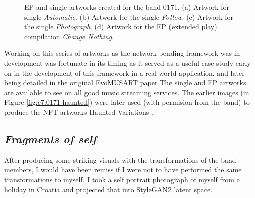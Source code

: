 \begin{figure}[!htbp]
    \caption[0171 EP artworks]{EP and single artworks created for the band 0171. (a) Artwork for single \textit{Automatic}. (b) Artwork for the single \textit{Follow}. (c) Artwork for the single \textit{Photograph}. (d) Artwork for the EP (extended play) compilation \textit{Change Nothing}.}
    \label{fig:c7:0171-EP}
 \end{figure}

Working on this series of artworks as the network bending framework was in development was fortunate in its timing as it served as a useful case study early on in the development of this framework in a real world application, and later being detailed in the original EvoMUSART paper \citep{broad2021network} 
The single and EP artworks are available to see on all good music streaming services.
The earlier images (in Figure \ref{fig:c7:0171-haunted}) were later used (with permision from the band) to produce the NFT artworks Haunted Variations \citep{broad2021haunted1,broad2021haunted2}. 

\subsection{\textit{Fragments of self}}
\label{c7:subsubsec:fragments}

After producing some striking visuals with the transformations of the band members, I would have been remiss if I were not to have performed the same transformations to myself. 
I took a self portrait photograph of myself from a holiday in Croatia and projected that into StyleGAN2 latent space. 



